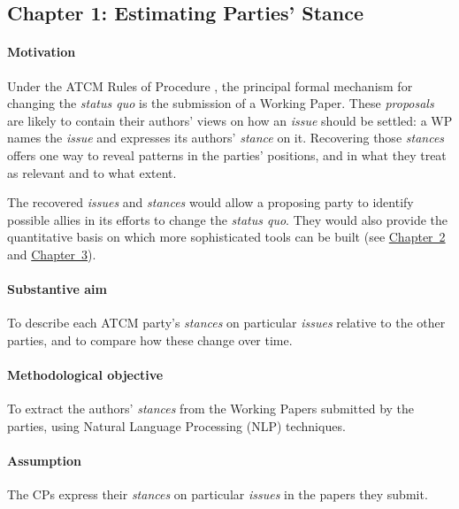 \subsection{Chapter 1: Estimating Parties' Stance}
\label{sec:ch1}

\paragraph{Motivation}
Under the ATCM Rules of Procedure \parencite{ATS2023RoP}, the principal formal mechanism for
changing the \textit{status quo} is the submission of a Working Paper. These \textit{proposals}
are likely to contain their authors' views on how an \textit{issue} should be settled: a WP names
the \textit{issue} and expresses its authors' \textit{stance} on it. Recovering those
\textit{stances} offers one way to reveal patterns in the parties' positions, and in what they
treat as relevant and to what extent.

The recovered \textit{issues} and \textit{stances} would allow a proposing party to identify
possible allies in its efforts to change the \textit{status quo}. They would also provide the
quantitative basis on which more sophisticated tools can be built
(see \hyperref[sec:ch2]{Chapter~2} and \hyperref[sec:ch3]{Chapter~3}).

\paragraph{Substantive aim}
To describe each ATCM party's \textit{stances} on particular \textit{issues} relative to the
other parties, and to compare how these change over time.

\paragraph{Methodological objective}
To extract the authors' \textit{stances} from the Working Papers submitted by the parties, using
Natural Language Processing (NLP) techniques.

\paragraph{Assumption}
The CPs express their \textit{stances} on particular \textit{issues} in the papers they submit.

